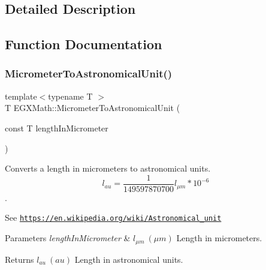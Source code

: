 \subsection{Detailed Description}


\subsection{Function Documentation}
\mbox{\label{group___e_g_x_math-_conversions-_length_conversions-_micrometer-_astronomical_ga910b8baeb25ec569394e5563afebc70f}} 
\subsubsection{\texorpdfstring{Micrometer\+To\+Astronomical\+Unit()}{MicrometerToAstronomicalUnit()}}
{\footnotesize\ttfamily template$<$typename T $>$ \\
T E\+G\+X\+Math\+::\+Micrometer\+To\+Astronomical\+Unit (\begin{DoxyParamCaption}\item[{const T}]{length\+In\+Micrometer }\end{DoxyParamCaption})}



Converts a length in micrometers to astronomical units. \[ l_{au}= \frac{1}{149597870700} l_{\mu m} * 10^{-6} \]. 

See \href{https://en.wikipedia.org/wiki/Astronomical_unit}{\tt https\+://en.\+wikipedia.\+org/wiki/\+Astronomical\+\_\+unit} 
\begin{DoxyParams}{Parameters}
{\em length\+In\+Micrometer} & $ l_{\mu m}\ (\mu m)$ Length in micrometers. \\
\hline
\end{DoxyParams}
\begin{DoxyReturn}{Returns}
$ l_{au}\ (au)$ Length in astronomical units. 
\end{DoxyReturn}
\mbox{\label{group___e_g_x_math-_conversions-_length_conversions-_micrometer-_astronomical_ga17ce0795cd099de3fd453a455f0a2260}} 
